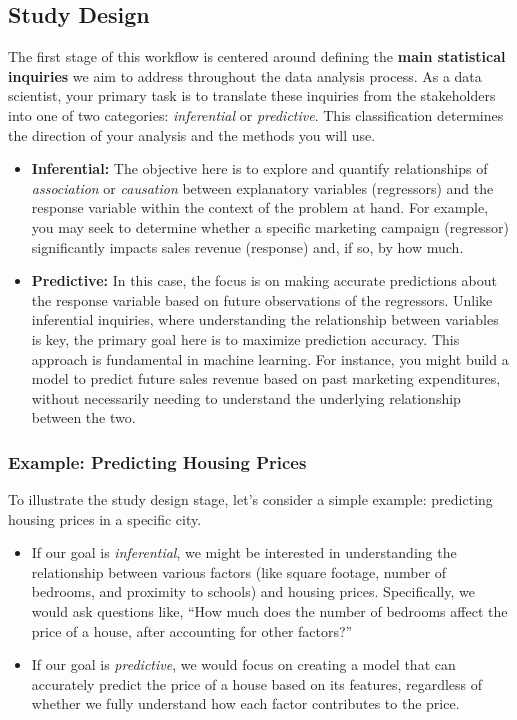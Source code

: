 \documentclass[
  letterpaper,
  DIV=11,
  numbers=noendperiod]{scrreprt}
\begin{document}
\subsection{Study Design}\label{sec-ds-workflow-study-design}

The first stage of this workflow is centered around defining the
\textbf{main statistical inquiries} we aim to address throughout the
data analysis process. As a data scientist, your primary task is to
translate these inquiries from the stakeholders into one of two
categories: \emph{inferential} or \emph{predictive}. This classification
determines the direction of your analysis and the methods you will use.

\begin{itemize}
\item
  \textbf{Inferential:} The objective here is to explore and quantify
  relationships of \emph{association} or \emph{causation} between
  explanatory variables (regressors) and the response variable within
  the context of the problem at hand. For example, you may seek to
  determine whether a specific marketing campaign (regressor)
  significantly impacts sales revenue (response) and, if so, by how
  much.
\item
  \textbf{Predictive:} In this case, the focus is on making accurate
  predictions about the response variable based on future observations
  of the regressors. Unlike inferential inquiries, where understanding
  the relationship between variables is key, the primary goal here is to
  maximize prediction accuracy. This approach is fundamental in machine
  learning. For instance, you might build a model to predict future
  sales revenue based on past marketing expenditures, without
  necessarily needing to understand the underlying relationship between
  the two.
\end{itemize}

\subsubsection{Example: Predicting Housing
Prices}\label{example-predicting-housing-prices}

To illustrate the study design stage, let's consider a simple example:
predicting housing prices in a specific city.

\begin{itemize}
\item
  If our goal is \emph{inferential}, we might be interested in
  understanding the relationship between various factors (like square
  footage, number of bedrooms, and proximity to schools) and housing
  prices. Specifically, we would ask questions like, ``How much does the
  number of bedrooms affect the price of a house, after accounting for
  other factors?''
\item
  If our goal is \emph{predictive}, we would focus on creating a model
  that can accurately predict the price of a house based on its
  features, regardless of whether we fully understand how each factor
  contributes to the price.
\end{itemize}
\end{document}
